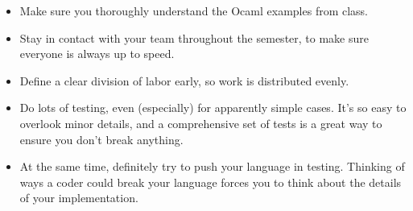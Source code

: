 \begin{itemize}
\item 	Make sure you thoroughly understand the Ocaml examples from class.
\item  	Stay in contact with your team throughout the semester, to make sure 
	everyone is always up to speed.
\item 	Define a clear division of labor early, so work is distributed evenly.
\item 	Do lots of testing, even (especially) for apparently simple cases.
	It's so easy to overlook minor details, and a comprehensive set of tests
	is a great way to ensure you don't break anything.
\item 	At the same time, definitely try to push your language in testing.
	Thinking of ways a coder could break your language forces you to think about
	the details of your implementation.
\end{itemize}


